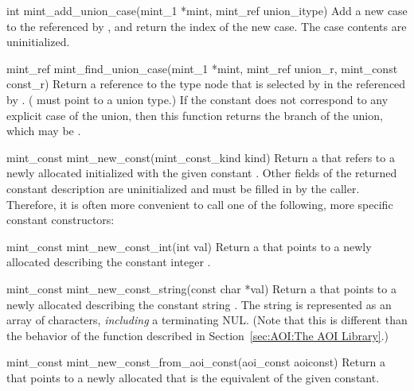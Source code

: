 \begin{cprototypelist}
  \item[int mint_add_union_case(mint_1 *mint, mint_ref union_itype)]
  Add a new case to the  referenced by
  , and return the index of the new case.  The case
  contents are uninitialized.

  \item[mint_ref mint_find_union_case(mint_1 *mint, mint_ref union_r,
                                      mint_const const_r)]
  Return a reference to the \MINT{} type node that is selected by
   in the  referenced by
  .  ( must point to a union type.)
  If the constant does not correspond to any explicit case of the union, then
  this function returns the  branch of the union, which may be
  .


  \item[mint_const mint_new_const(mint_const_kind kind)]
  Return a  that refers to a newly allocated
   initialized with the given \MINT{} constant
  .  Other fields of the returned constant description are
  uninitialized and must be filled in by the caller.  Therefore, it is often
  more convenient to call one of the following, more specific constant
  constructors:
  \begin{cprototypelist}
    \item[mint_const mint_new_const_int(int val)]
    Return a  that points to a newly allocated
     describing the constant integer .

    \item[mint_const mint_new_const_string(const char *val)]
    Return a  that points to a newly allocated
     describing the constant string .  The
    string is represented as an array of characters, \emph{including} a
    terminating NUL\@.  (Note that this is different than the behavior of the
     function described in
    Section~\ref{sec:AOI:The AOI Library}.)

    \item[mint_const mint_new_const_from_aoi_const(aoi_const aoiconst)]
    Return a  that points to a newly allocated
     that is the \MINT{} equivalent of the given \AOI{}
    constant.


\end{cprototypelist}
\end{cprototypelist}
